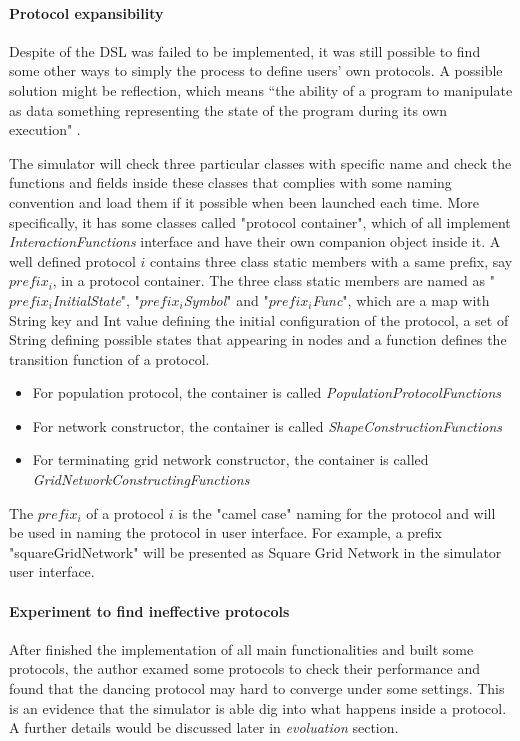 \paragraph{Protocol expansibility}
Despite of the DSL was failed to be implemented, it was still possible to find some other ways to simply the process to define users' own protocols.
A possible solution might be reflection, which means “the ability of a program to manipulate as data something representing the state of the
program during its own execution" \cite{reflection96}.
\par\noindent
The simulator will check three particular classes with specific name
and check the functions and fields inside these classes that complies with some naming convention and load them if it possible when been launched each time.
More specifically, it has some classes called "protocol container", which of all implement \textit{InteractionFunctions} interface
and have their own companion object inside it. A well defined protocol $i$ contains three class static members with a same prefix, say $prefix_{i}$, in a protocol container.
The three class static members are named as "\textit{$prefix_{i}$InitialState}", "\textit{$prefix_{i}$Symbol}" and "\textit{$prefix_{i}$Func}", which are a map with String key and Int value defining the
initial configuration of the protocol, a set of String defining possible states that appearing in nodes and a function defines the transition function of a protocol.
\begin{itemize}
  \item For population protocol, the container is called \textit{PopulationProtocolFunctions}
  \item For network constructor, the container is called \textit{ShapeConstructionFunctions}
  \item For terminating grid network constructor, the container is called \textit{GridNetworkConstructingFunctions}
\end{itemize}
\par\noindent
The $prefix_{i}$ of a protocol $i$ is the "camel case" naming for the protocol and will be used in naming the protocol in user interface. For example,
a prefix "squareGridNetwork" will be presented as Square Grid Network in the simulator user interface.

\paragraph{Experiment to find ineffective protocols}
After finished the implementation of all main functionalities and built some protocols, the author examed some protocols to check their performance
and found that the dancing protocol may hard to converge under some settings. This is an evidence that the simulator is able dig into what happens inside
a protocol. A further details would be discussed later in \textit{evoluation} section.
